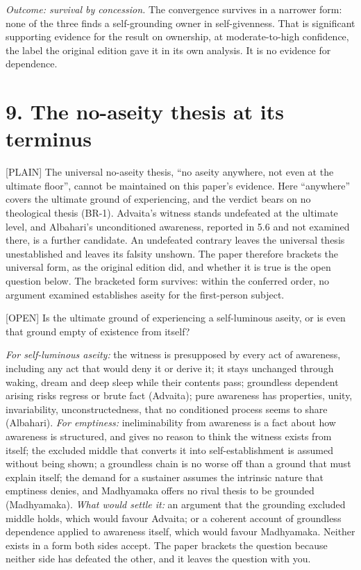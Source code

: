 \documentclass[11pt]{article}
\newcommand{\register}[1]{{\ttfamily\small #1}}
\begin{document}
\emph{Outcome: survival by concession.} The convergence survives in a narrower form: none of the three finds a self-grounding owner in self-givenness. That is significant supporting evidence for the result on ownership, at moderate-to-high confidence, the label the original edition gave it in its own analysis. It is no evidence for dependence.

\section*{9. The no-aseity thesis at its terminus}

\register{[PLAIN]} The universal no-aseity thesis, ``no aseity anywhere, not even at the ultimate floor'', cannot be maintained on this paper's evidence. Here ``anywhere'' covers the ultimate ground of experiencing, and the verdict bears on no theological thesis (BR-1). Advaita's witness stands undefeated at the ultimate level, and Albahari's unconditioned awareness, reported in 5.6 and not examined there, is a further candidate. An undefeated contrary leaves the universal thesis unestablished and leaves its falsity unshown. The paper therefore brackets the universal form, as the original edition did, and whether it is true is the open question below. The bracketed form survives: within the conferred order, no argument examined establishes aseity for the first-person subject.

\register{[OPEN]} Is the ultimate ground of experiencing a self-luminous aseity, or is even that ground empty of existence from itself?

\emph{For self-luminous aseity:} the witness is presupposed by every act of awareness, including any act that would deny it or derive it; it stays unchanged through waking, dream and deep sleep while their contents pass; groundless dependent arising risks regress or brute fact (Advaita); pure awareness has properties, unity, invariability, unconstructedness, that no conditioned process seems to share (Albahari). \emph{For emptiness:} ineliminability from awareness is a fact about how awareness is structured, and gives no reason to think the witness exists from itself; the excluded middle that converts it into self-establishment is assumed without being shown; a groundless chain is no worse off than a ground that must explain itself; the demand for a sustainer assumes the intrinsic nature that emptiness denies, and Madhyamaka offers no rival thesis to be grounded (Madhyamaka). \emph{What would settle it:} an argument that the grounding excluded middle holds, which would favour Advaita; or a coherent account of groundless dependence applied to awareness itself, which would favour Madhyamaka. Neither exists in a form both sides accept. The paper brackets the question because neither side has defeated the other, and it leaves the question with you.
\end{document}
